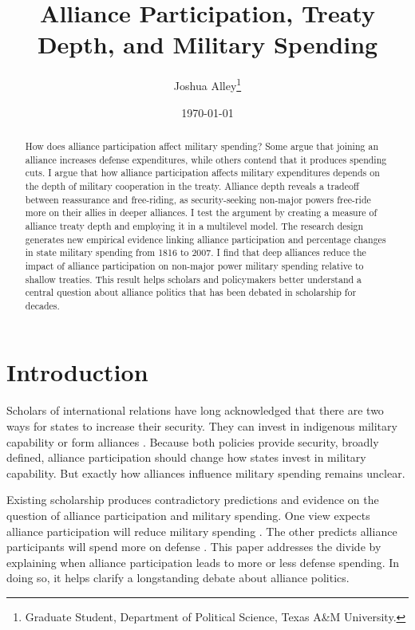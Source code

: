 \documentclass[12pt]{article}
\title{\textbf{Alliance Participation, Treaty Depth, and Military Spending}}
\author{Joshua Alley\footnote{Graduate Student,
Department of Political Science, Texas A\&M University.}}
\date{{\normalsize \today}}
\begin{document}
\maketitle 

\doublespace 

\begin{abstract}
How does alliance participation affect military spending? 
Some argue that joining an alliance increases defense expenditures, while others contend that it produces spending cuts.
I argue that how alliance participation affects military expenditures depends on the depth of military cooperation in the treaty. 
Alliance depth reveals a tradeoff between reassurance and free-riding, as security-seeking non-major powers free-ride more on their allies in deeper alliances.   
I test the argument by creating a measure of alliance treaty depth and employing it in a multilevel model. 
The research design generates new empirical evidence linking alliance participation and percentage changes in state military spending from 1816 to 2007. 
I find that deep alliances reduce the impact of alliance participation on non-major power military spending relative to shallow treaties.  
This result helps scholars and policymakers better understand a central question about alliance politics that has been debated in scholarship for decades. 
\end{abstract}


 \newpage 


\section{Introduction}


Scholars of international relations have long acknowledged that there are two ways for states to increase their security. 
They can invest in indigenous military capability or form alliances \citep{Morgenthau1948, Altfield1984, Morrow1993}.
Because both policies provide security, broadly defined, alliance participation should change how states invest in military capability. 
But exactly how alliances influence military spending remains unclear. 


Existing scholarship produces contradictory predictions and evidence on the question of alliance participation and military spending. 
One view expects alliance participation will reduce military spending \citep{Morrow1993, Conybeare1994, DigiuseppePoast2016}. 
The other predicts alliance participants will spend more on defense \citep{Diehl1994, MorganPalmer2006}.
This paper addresses the divide by explaining when alliance participation leads to more or less defense spending. 
In doing so, it helps clarify a longstanding debate about alliance politics.
\end{document}
